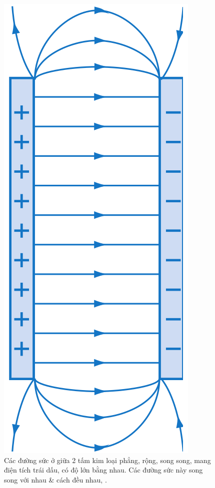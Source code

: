 \documentclass[oneside]{book}
\numberwithin{equation}{section}
\begin{document}
\begin{figure}[H]
	\centering
	\includegraphics[scale=0.15]{duong_suc_dien_truong_deu}
	\caption{Các đường sức ở giữa 2 tấm kim loại phẳng, rộng, song song, mang điện tích trái dấu, có độ lớn bằng nhau. Các đường sức này song song với nhau \& cách đều nhau, \cite[Hình 3.8, p. 16]{SGK_Vat_Ly_11_nang_cao}.}
	\label{fig:duong_suc_dien_truong_deu}
\end{figure}
\end{document}
